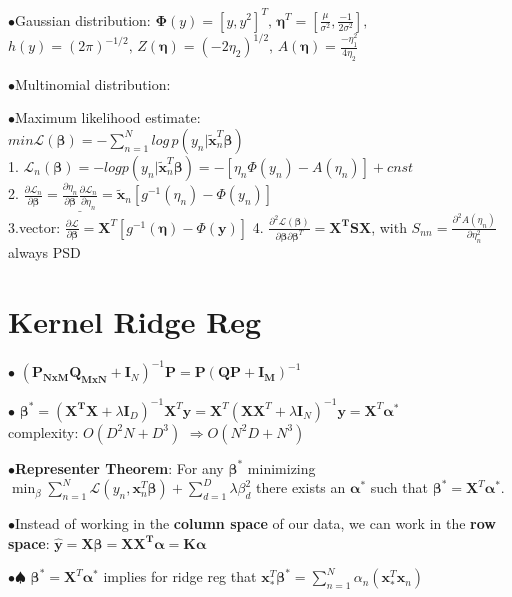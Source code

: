\documentclass[10pt,a4paper,landscape]{article}
\renewcommand{\bf}[1]{\ensuremath{\mathbf{#1}}}
\newcommand{\balpha}{\boldsymbol\alpha}
\newcommand{\bbeta}{\boldsymbol\beta}
\begin{document}
\begin{multicols*}{6}
$\bullet$Gaussian distribution: $\boldsymbol\Phi(y)=[y, y^2]^T , \, \boldsymbol\eta^T=[\frac{\mu}{\sigma^2}, \frac{-1}{2\sigma^2}] ,\,$
$h(y)=(2\pi)^{-1/2} ,\, Z(\boldsymbol\eta)=(-2\eta_2)^{1/2} ,\, A(\boldsymbol\eta)=\frac{-\eta_1^2}{4\eta_2}$

$\bullet$Multinomial distribution: 

$\bullet$Maximum likelihood estimate:\\
$min\mathcal{L}(\bbeta)=-\sum_{n=1}^Nlog\,p(y_n|\tilde{\bf{x}}_n^T\bbeta)$\\
1. $\mathcal{L}_n(\bbeta)=-logp(y_n|\tilde{\bf{x}}_n^T\bbeta)=-[\eta_n\Phi(y_n)-A(\eta_n)]+cnst$\\
2. $\frac{\partial \mathcal{L}_n}{\partial \bbeta}=\underline{\frac{\partial \eta_n}{\partial \bbeta}\frac{\partial \mathcal{L}_n}{\partial \eta_n}}=\tilde{\bf{x}}_n[g^{-1}(\eta_n)-\Phi(y_n)]$\\
3.vector: $\frac{\partial \bf{\mathcal{L}}}{\partial \bbeta}=\bf{X}^T[g^{-1}(\boldsymbol\eta)-\Phi(\bf{y})]$
4. $\frac{\partial ^2 \bf{\mathcal{L}}(\bbeta)}{\partial \bbeta \partial \bbeta^T}=\bf{X^TSX}$, with $S_{nn}=\frac{\partial ^2 A(\eta_n)}{\partial \eta_n^2}$
always PSD





\section{Kernel Ridge Reg}
$\bullet$ $(\bf{P_{NxM}Q_{MxN}}+\bf{I}_N)^{-1}\bf{P}=\bf{P}(\bf{QP+I_M})^{-1}$

$\bullet$ $\bbeta^*=(\bf{X^TX}+\lambda\bf{I}_D)^{-1}\bf{X}^T\bf{y}=\bf{X}^T(\bf{XX}^T+\lambda\bf{I}_N)^{-1}\bf{y}=\bf{X}^T\boldsymbol\alpha^*$\\
complexity: $O(D^2N+D^3)$ $\Rightarrow O(N^2D+N^3)$

$\bullet$\textbf{Representer Theorem}: For any $\bbeta^*$ minimizing
$\min_\beta \sum_{n=1}^N \mathcal{L}(y_n, \bf{x}_n^T \bbeta) + \sum_{d=1}^D \lambda \beta_d^2$
there exists an $\balpha^*$ such that $\bbeta^* = \bf{X}^T \balpha^*$.

$\bullet$Instead of working in the \textbf{column space} of our data, we can work in the \textbf{row space}:
$\bf{\hat{y} = X \bbeta = X X^T \balpha = K \balpha}$


$\bullet\spadesuit$ $\bbeta^*=\bf{X}^T\boldsymbol\alpha^*$ implies for ridge reg that $\bf{x}_*^T\bbeta^*=\sum_{n=1}^N\alpha_n(\bf{x}_*^T\bf{x}_n)$


\end{multicols*}
\end{document}
